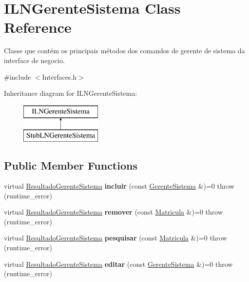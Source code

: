 \hypertarget{class_i_l_n_gerente_sistema}{}\section{I\+L\+N\+Gerente\+Sistema Class Reference}
\label{class_i_l_n_gerente_sistema}


Classe que contém os principais métodos dos comandos de gerente de sistema da interface de negocio.  




{\ttfamily \#include $<$Interfaces.\+h$>$}

Inheritance diagram for I\+L\+N\+Gerente\+Sistema\+:\begin{figure}[H]
\begin{center}
\leavevmode
\includegraphics[height=2.000000cm]{class_i_l_n_gerente_sistema}
\end{center}
\end{figure}
\subsection*{Public Member Functions}
\begin{DoxyCompactItemize}
\item 
\hypertarget{class_i_l_n_gerente_sistema_a2e8119e31d7288816a77660b7e6bf514}{}\label{class_i_l_n_gerente_sistema_a2e8119e31d7288816a77660b7e6bf514} 
virtual \hyperlink{class_resultado_gerente_sistema}{Resultado\+Gerente\+Sistema} {\bfseries incluir} (const \hyperlink{class_gerente_sistema}{Gerente\+Sistema} \&)=0  throw (runtime\+\_\+error)
\item 
\hypertarget{class_i_l_n_gerente_sistema_a9c3b27feb0b9e041988e4406332f0680}{}\label{class_i_l_n_gerente_sistema_a9c3b27feb0b9e041988e4406332f0680} 
virtual \hyperlink{class_resultado_gerente_sistema}{Resultado\+Gerente\+Sistema} {\bfseries remover} (const \hyperlink{class_matricula}{Matricula} \&)=0  throw (runtime\+\_\+error)
\item 
\hypertarget{class_i_l_n_gerente_sistema_a91d12c41e8bce59edaf38d857dd6c3b6}{}\label{class_i_l_n_gerente_sistema_a91d12c41e8bce59edaf38d857dd6c3b6} 
virtual \hyperlink{class_resultado_gerente_sistema}{Resultado\+Gerente\+Sistema} {\bfseries pesquisar} (const \hyperlink{class_matricula}{Matricula} \&)=0  throw (runtime\+\_\+error)
\item 
\hypertarget{class_i_l_n_gerente_sistema_a5653ec6bc3c34de3455a5566ec12759c}{}\label{class_i_l_n_gerente_sistema_a5653ec6bc3c34de3455a5566ec12759c} 
virtual \hyperlink{class_resultado_gerente_sistema}{Resultado\+Gerente\+Sistema} {\bfseries editar} (const \hyperlink{class_gerente_sistema}{Gerente\+Sistema} \&)=0  throw (runtime\+\_\+error)
\end{DoxyCompactItemize}


